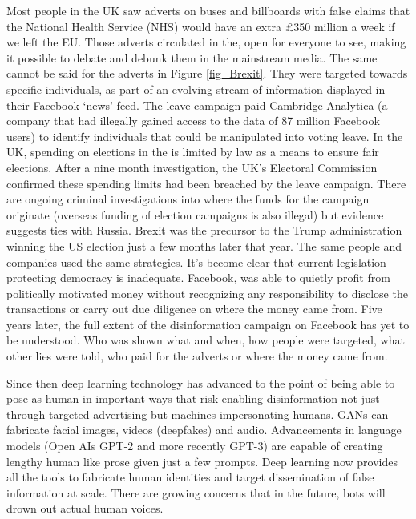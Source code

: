 Most people in the UK saw adverts on buses and billboards with false claims that the National Health Service (NHS) would have an extra \pounds350 million a week if we left the EU. Those adverts circulated in the, open for everyone to see, making it possible to debate and debunk them in the mainstream media. The same cannot be said for the adverts in Figure \ref{fig_Brexit}. They were targeted towards specific individuals, as part of an evolving stream of information displayed in their Facebook `news' feed. The leave campaign paid Cambridge Analytica (a company that had illegally gained access to the data of 87 million Facebook users) to identify individuals that could be manipulated into voting leave. In the UK, spending on elections in the is limited by law as a means to ensure fair elections. After a nine month investigation, the UK's Electoral Commission confirmed these spending limits had been breached by the leave campaign. There are ongoing criminal investigations into where the funds for the campaign originate (overseas funding of election campaigns is also illegal) but evidence suggests ties with Russia. Brexit was the precursor to the Trump administration winning the US election just a few months later that year. The same people and companies used the same strategies. It's become clear that current legislation protecting democracy is inadequate. Facebook, was able to quietly profit from politically motivated money without recognizing any responsibility to disclose the transactions or carry out due diligence on where the money came from. Five years later, the full extent of the disinformation campaign on Facebook has yet to be understood. Who was shown what and when, how people were targeted, what other lies were told, who paid for the adverts or where the money came from.

Since then deep learning technology has advanced to the point of being able to pose as human in important ways that risk enabling disinformation not just through targeted advertising but machines impersonating humans. GANs can fabricate facial images, videos (deepfakes) and audio. Advancements in language models (Open AIs GPT-2 and more recently GPT-3) are capable of creating lengthy human like prose given just a few prompts. Deep learning now provides all the tools to fabricate human identities and target dissemination of false information at scale. There are growing concerns that in the future, bots will drown out actual human voices.

